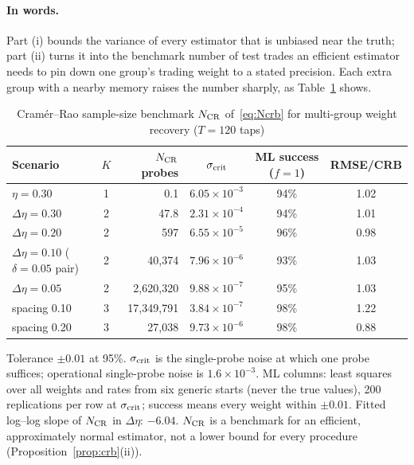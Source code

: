 \documentclass[12pt]{article}
\theoremstyle{definition}
\theoremstyle{remark}
\begin{document}
\paragraph{In words.} Part (i) bounds the variance of every estimator that is unbiased near the truth; part (ii) turns it into the benchmark number of test trades an efficient estimator needs to pin down one group's trading weight to a stated precision. Each extra group with a nearby memory raises the number sharply, as Table~\ref{tab:crb} shows.

\begin{table}[t]\centering\small
\begin{threeparttable}
\caption{Cram\'er--Rao sample-size benchmark $N_{\rm CR}$ of~\eqref{eq:Ncrb} for multi-group weight recovery ($T=120$ taps)}\label{tab:crb}
\begin{tabular}{lcrccc}
\toprule
Scenario & $K$ & $N_{\rm CR}$ probes & $\sigma_{\rm crit}$ & ML success ($f=1$) & RMSE/CRB\\
\midrule
$\eta=0.30$ & 1 & 0.1 & $6.05\times10^{-3}$ & 94\% & 1.02\\
$\Delta\eta=0.30$ & 2 & 47.8 & $2.31\times10^{-4}$ & 94\% & 1.01\\
$\Delta\eta=0.20$ & 2 & 597 & $6.55\times10^{-5}$ & 96\% & 0.98\\
$\Delta\eta=0.10$ ($\delta=0.05$ pair) & 2 & 40{,}374 & $7.96\times10^{-6}$ & 93\% & 1.03\\
$\Delta\eta=0.05$ & 2 & 2{,}620{,}320 & $9.88\times10^{-7}$ & 95\% & 1.03\\
spacing 0.10 & 3 & 17{,}349{,}791 & $3.84\times10^{-7}$ & 98\% & 1.22\\
spacing 0.20 & 3 & 27{,}038 & $9.73\times10^{-6}$ & 98\% & 0.88\\
\bottomrule
\end{tabular}
\begin{tablenotes}\footnotesize\item Tolerance $\pm0.01$ at 95\%. $\sigma_{\rm crit}$ is the single-probe noise at which one probe suffices; operational single-probe noise is $1.6\times10^{-3}$. ML columns: least squares over all weights and rates from six generic starts (never the true values), 200 replications per row at $\sigma_{\rm crit}$; success means every weight within $\pm0.01$. Fitted log--log slope of $N_{\rm CR}$ in $\Delta\eta$: $-6.04$. $N_{\rm CR}$ is a benchmark for an efficient, approximately normal estimator, not a lower bound for every procedure (Proposition~\ref{prop:crb}(ii)). \end{tablenotes}
\end{threeparttable}
\end{table}
\end{document}
